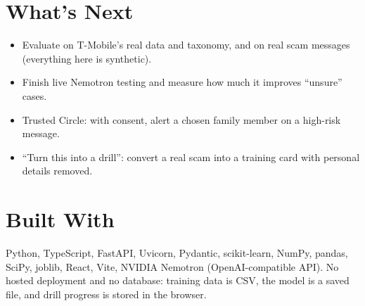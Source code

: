 \documentclass[11pt]{article}
\begin{document}
\section*{What's Next}
\begin{itemize}
  \item Evaluate on T-Mobile's real data and taxonomy, and on real scam messages (everything here is synthetic).
  \item Finish live Nemotron testing and measure how much it improves ``unsure'' cases.
  \item Trusted Circle: with consent, alert a chosen family member on a high-risk message.
  \item ``Turn this into a drill'': convert a real scam into a training card with personal details removed.
\end{itemize}

\section*{Built With}
Python, TypeScript, FastAPI, Uvicorn, Pydantic, scikit-learn, NumPy, pandas, SciPy, joblib, React, Vite, NVIDIA Nemotron (OpenAI-compatible API). No hosted deployment and no database: training data is CSV, the model is a saved file, and drill progress is stored in the browser.
\end{document}
